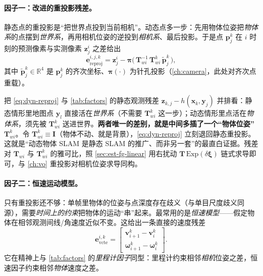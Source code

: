 \paragraph{因子一：改进的重投影残差。}
静态点的重投影是“把世界点投到当前相机”。动态点多一步：先用物体位姿把\emph{物体系}的点摆到\emph{世界系}，再用相机位姿的逆投到\emph{相机系}、最后投影。于是点 $\mathbf{p}_j^{k}$ 在 $i$ 时刻的预测像素与实测像素 $\mathbf{z}_j^{i}$ 之差给出
\begin{equation}
  \mathbf{e}_{\mathrm{reproj}}^{i,j,k}
  =\mathbf{z}_j^{i}-\boldsymbol\pi\!\Big(\,\mathbf{T}_{wi}^{-1}\,\mathbf{T}_{wi}^{k}\,\tilde{\mathbf{p}}_j^{k}\,\Big),
  \label{eq:dyn-reproj}
\end{equation}
其中 $\tilde{\mathbf{p}}_j^{k}\in\mathbb{R}^4$ 是 $\mathbf{p}_j^{k}$ 的齐次坐标、$\boldsymbol\pi(\cdot)$ 为针孔投影（\cref{ch:camera}，此处对齐次点重载）。

\begin{insight}
把 \cref{eq:dyn-reproj} 与 \cref{tab:factors} 的静态观测残差 $\mathbf{z}_{k,j}-h(\mathbf{x}_k,\mathbf{y}_j)$ 并排看：静态情形里地图点 $\mathbf{y}_l$ 直接活在\emph{世界系}（不需要 $\mathbf{T}_{wi}^{k}$ 这一步）；动态情形里点活在\emph{物体系}，须先被 $\mathbf{T}_{wi}^{k}$ 送进世界。\textbf{两者唯一的差别，就是中间多插了一个“物体位姿” $\mathbf{T}_{wi}^{k}$}。令 $\mathbf{T}_{wi}^{k}\equiv\mathbf{I}$（物体不动、就是背景），\cref{eq:dyn-reproj} 立刻退回静态重投影。这就是“动态物体 SLAM 是静态 SLAM 的推广、而非另一套”的最直白证据。残差对 $\mathbf{T}_{wi}$ 与 $\mathbf{T}_{wi}^{k}$ 的雅可比，照 \cref{sec:est-fg-linear} 用右扰动 $\mathbf{T}\,\mathrm{Exp}(\delta\boldsymbol\xi)$ 链式求导即可，与 \cref{ch:vo} 重投影对相机位姿求导同构。
\end{insight}

\paragraph{因子二：恒速运动模型。}
只有重投影还不够：单帧里物体的位姿与点深度存在歧义（与单目尺度歧义同源），需要\emph{时间上的约束}把物体的运动“串”起来。最常用的是\emph{恒速模型}——假定物体在相邻观测间线/角速度近似不变。这给出一条直接的速度残差
\begin{equation}
  \mathbf{e}_{\mathrm{vcte}}^{i,k}
  =\begin{bmatrix}\mathbf{v}_{i+1}^{k}-\mathbf{v}_i^{k}\\[1mm]\boldsymbol\omega_{i+1}^{k}-\boldsymbol\omega_i^{k}\end{bmatrix}.
  \label{eq:dyn-vcte}
\end{equation}
它在精神上与 \cref{tab:factors} 的\emph{里程计因子}同型：里程计约束相邻\emph{相机}位姿之差，恒速因子约束相邻\emph{物体}速度之差。

